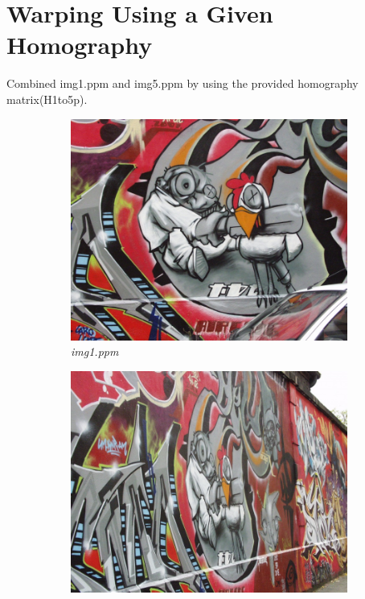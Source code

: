 \documentclass[11pt, a4paper]{article}
\begin{document}
\section{Warping Using a Given Homography}
Combined img1.ppm and img5.ppm by using the provided homography matrix(H1to5p).\cite{VGG}
\begin{figure}[H]
	\centering
	\begin{subfigure}[b]{0.32\textwidth}
		\centering
		\includegraphics[width=\textwidth]{./images/Q2im1.jpg}
		\caption{{\small \textit{img1.ppm}}}
		\label{fig:2im1}
	\end{subfigure}
	\hfill
	\begin{subfigure}[b]{0.32\textwidth}
		\centering
		\includegraphics[width=\textwidth]{./images/Q2im5.jpg}

\end{subfigure}
\end{figure}
\end{document}
